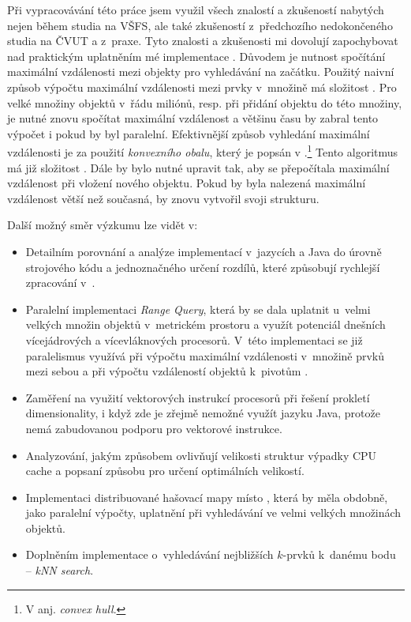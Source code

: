 Při vypracovávání této práce jsem využil všech znalostí a zkušeností nabytých nejen během studia na VŠFS, ale také zkušeností z~předchozího nedokončeného studia na ČVUT a z~praxe.
Tyto znalosti a zkušenosti mi dovolují zapochybovat nad praktickým uplatněním mé implementace .
Důvodem je nutnost spočítání maximální vzdálenosti mezi objekty pro vyhledávání na začátku.
Použitý naivní způsob výpočtu maximální vzdálenosti mezi prvky v~množině má složitost .
Pro velké množiny objektů v~řádu miliónů, resp. při přidání objektu do této množiny, je nutné znovu spočítat maximální vzdálenost a většinu času by zabral tento výpočet i pokud by byl paralelní.
Efektivnější způsob vyhledání maximální vzdálenosti je za použití \emph{konvexního obalu}, který je popsán v \cite{Cormen:2001:IA:580470}.\footnote{V anj. \emph{convex hull}.}
Tento algoritmus má již složitost .
Dále by bylo nutné upravit \MIndex{} tak, aby se přepočítala maximální vzdálenost při vložení nového objektu.
Pokud by byla nalezená maximální vzdálenost větší než současná, \MIndex{} by znovu vytvořil svoji strukturu.

Další možný směr výzkumu  lze vidět v:
\begin{itemize}
\item Detailním porovnání a analýze implementací v~jazycích \CC{} a Java do úrovně strojového kódu a jednoznačného určení rozdílů, které způsobují rychlejší zpracování v~\CC{}.
\item Paralelní implementaci \emph{Range Query}, která by se dala uplatnit u~velmi velkých množin objektů v~metrickém prostoru a využít potenciál dnešních vícejádrových a vícevláknových procesorů.
V~této implementaci se již paralelismus využívá při výpočtu maximální vzdálenosti v~množině prvků mezi sebou a při výpočtu vzdáleností objektů k~pivotům .
\item Zaměření na využití vektorových instrukcí procesorů při řešení prokletí dimensionality, i když zde je zřejmě nemožné využít jazyku Java, protože nemá zabudovanou podporu pro vektorové instrukce.
\item Analyzování, jakým způsobem ovlivňují velikosti struktur výpadky CPU cache a popsaní způsobu pro určení optimálních velikostí.
\item Implementaci distribuované hašovací mapy místo \BPTree{}, která by měla obdobně, jako paralelní výpočty, uplatnění při vyhledávání ve velmi velkých množinách objektů.
\item Doplněním implementace o~vyhledávání nejbližších $k$-prvků k~danému bodu -- \emph{kNN search}.
 \end{itemize}
